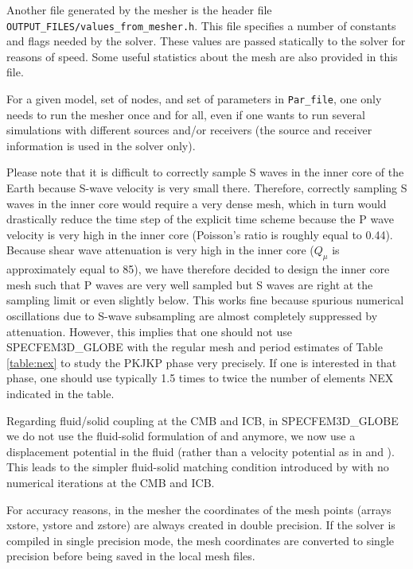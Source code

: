 \documentclass[oneside,english]{book}
\begin{document}
Another file generated by the mesher is the header file \texttt{OUTPUT\_FILES/values\_from\_mesher.h}.
This file specifies a number of constants and flags needed by the
solver. These values are passed statically to the solver for reasons
of speed. Some useful statistics about the mesh are also provided
in this file.

For a given model, set of nodes, and set of parameters in \texttt{Par\_file},
one only needs to run the mesher once and for all, even if one wants
to run several simulations with different sources and/or receivers
(the source and receiver information is used in the solver only).

Please note that it is difficult to correctly sample S waves in the
inner core of the Earth because S-wave velocity is very small there.
Therefore, correctly sampling S waves in the inner core would require
a very dense mesh, which in turn would drastically reduce the time
step of the explicit time scheme because the P wave velocity is very
high in the inner core (Poisson's ratio is roughly equal to 0.44).
Because shear wave attenuation is very high in the inner core ($Q_{\mu}$
is approximately equal to 85), we have therefore decided to design
the inner core mesh such that P waves are very well sampled but S
waves are right at the sampling limit or even slightly below. This
works fine because spurious numerical oscillations due to S-wave subsampling
are almost completely suppressed by attenuation. However, this implies
that one should not use SPECFEM3D\_GLOBE with the regular mesh and
period estimates of Table \ref{table:nex} to study the PKJKP phase
very precisely. If one is interested in that phase, one should use
typically 1.5 times to twice the number of elements NEX indicated
in the table.

Regarding fluid/solid coupling at the CMB and ICB, in SPECFEM3D\_GLOBE
we do not use the fluid-solid formulation of \citet{KoTr02a} and
\citet{KoTr02b} anymore, we now use a displacement potential in the
fluid (rather than a velocity potential as in \citet{KoTr02a} and
\citet{KoTr02b}). This leads to the simpler fluid-solid matching
condition introduced by \citet{ChVa04} with no numerical iterations
at the CMB and ICB.

For accuracy reasons, in the mesher the coordinates of the mesh points
(arrays xstore, ystore and zstore) are always created in double precision.
If the solver is compiled in single precision mode, the mesh coordinates
are converted to single precision before being saved in the local
mesh files.
\end{document}
